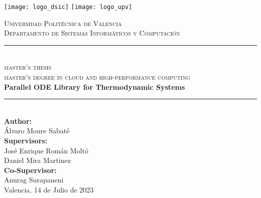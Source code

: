 \begin{titlepage}

\begin{paracol}{2}
	\centering
	\vspace*{-23pt}
	\texttt{[image: logo\_dsic]}
	\switchcolumn
	\centering
	\texttt{[image: logo\_upv]}
\end{paracol}

\center

\vspace{1cm}

\textsc{\LARGE Universidad Politécnica de Valencia}\\[0.8cm]

\textsc{\Large Departamento de Sistemas Informáticos y Computación}\\[0.8cm]

\rule{\linewidth}{0.8mm}\\[1cm]

\textsc{\LARGE master's thesis}\\[0.5cm]

\textsc{\LARGE master's degree in cloud and high-performance computing}\\[0.8cm]

{\bfseries \huge Parallel ODE Library for Thermodynamic Systems}\\[1cm]

\rule{\linewidth}{0.8mm}\\[1.5cm]


\textbf{\large Author:}\\[0.2cm]

{\large Álvaro Moure Sabaté}\\[0.5cm]

\textbf{\large Supervisors:}\\[0.2cm]
{\large José Enrique Román Moltó}\\
{\large Daniel Mira Martinez}\\[0.5cm]

\textbf{\large Co-Supervisor:}\\[0.2cm]
{\large Anurag Surapaneni}\\[2cm]

{\large Valencia, 14 de Julio de 2023}

\end{titlepage}